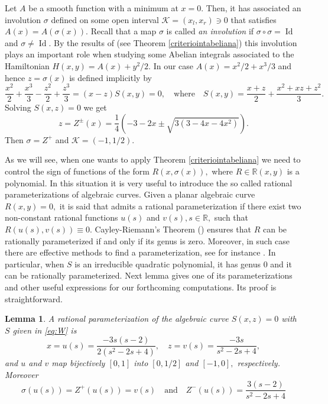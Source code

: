 \documentclass[12pt,a4paper,reqno]{amsart}
\newcommand{\R}{\mathbb{R}}
\newtheorem{lema}[teo]{Lemma}
\begin{document}
Let $ A $ be a smooth function with a minimum at $ x = 0.$ Then, it
has associated an involution $\sigma$ defined on some open interval
$\mathcal{K}= (x_l, x_r) \ni 0$ that satisfies $A(x)=A(\sigma(x)).$
Recall that a map $\sigma$ is called {\it an involution} if
  $\sigma \circ \sigma = \operatorname{Id}$ and $\sigma \neq
  \operatorname{Id}.$ By the results of \cite{GraManVil2011}
  (see Theorem \ref{criteriointabeliana}) this involution plays an important role when
  studying some Abelian integrals associated to the Hamiltonian
  $H(x,y)=A(x)+y^2/2.$ In our case $A(x)=x^2/2+x^3/3$ and hence
  $z=\sigma(x)$ is defined implicitly by
  \begin{equation}\label{eq:W}
\frac{x^2}2+\frac{x^3}3-\frac{z^2}2+\frac{z^3}3=(x-z)S(x,y)=0,\quad
\mbox{where}\quad S(x,y)= \frac {x+z} 2 +\frac{x^2+xz+z^2}3.
  \end{equation}
Solving $S(x,z)=0$  we get
\begin{equation}\label{eq:ivo1}
    z=Z^\pm(x)=\dfrac{1}{4} \left(-3 - 2 x \pm \sqrt{3(3 - 4 x - 4 x^2)}
     \right).
    \end{equation}
Then $\sigma=Z^+$ and $\mathcal{K}=(-1,1/2).$

 As we will see, when one wants to apply
Theorem \ref{criteriointabeliana} we need to control the sign of
functions of the form $R(x,\sigma(x)),$ where $R\in\R(x,y)$ is a
polynomial. In this situation it is very useful to introduce the so
called  rational parameterizations of algebraic curves. Given a
planar algebraic curve $R(x,y)=0,$ it is said that admits a rational
parameterization if there exist two non-constant rational functions
$u(s)$ and $v(s), s\in\R,$ such that $R(u(s),v(s))\equiv0.$
Cayley-Riemann's Theorem (\cite{Abh1988,AbhBaj1988}) ensures that
$R$ can be rationally parameterized if and only if its genus is
zero. Moreover, in such case there are effective methods to find a
parameterization, see for instance  \cite[Chap. 4\&5]{Sen2008}. In
particular, when $S$ is an irreducible quadratic polynomial, it has
genus 0 and it can be rationally parameterized. Next lemma gives one
of its parameterizations and other useful expressions for our
forthcoming computations. Its proof is straightforward.

\begin{lema}%
 A rational parameterization of the algebraic curve
$S(x,z)=0$ with $S$ given in \eqref{eq:W} is
\begin{equation*}%
x=u(s)=\frac{-3s(s-2)}{2(s^2-2s+4)},\quad
z=v(s)=\frac{-3s}{s^2-2s+4},
\end{equation*}
and $u$ and $v$ map bijectively $[0,1]$ into $[0,1/2]$ and $[-1,0],$
respectively. Moreover
\[
\sigma(u(s))=Z^+(u(s))=v(s)\quad \mbox{and}\quad
Z^-(u(s))=\frac{3(s-2)}{s^2-2s+4}
\]
\end{lema}
\end{document}
